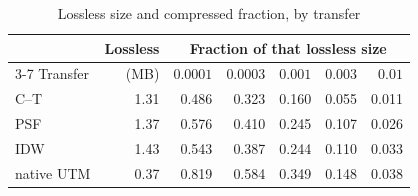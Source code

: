 \begin{table}[t]
\centering
\caption{Lossless size and compressed fraction, by transfer}
\label{tab:compactability}
\footnotesize
\begin{tabular}{@{}l r rrrrr@{}}
\toprule
 & Lossless & \multicolumn{5}{c}{Fraction of that lossless size} \\
\cmidrule(lr){3-7}
Transfer & (MB) & $0.0001$ & $0.0003$ & $0.001$ & $0.003$ & $0.01$ \\
\midrule
C--T & 1.31 & 0.486 & 0.323 & 0.160 & 0.055 & 0.011 \\
PSF & 1.37 & 0.576 & 0.410 & 0.245 & 0.107 & 0.026 \\
IDW & 1.43 & 0.543 & 0.387 & 0.244 & 0.110 & 0.033 \\
native UTM & 0.37 & 0.819 & 0.584 & 0.349 & 0.148 & 0.038 \\
\bottomrule
\end{tabular}

\end{table}
